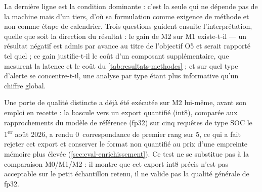La dernière ligne est la condition dominante : c'est la seule qui ne dépende pas de la machine mais
d'un tiers, d'où sa formulation comme exigence de méthode et non comme étape de calendrier. Trois
questions guident ensuite l'interprétation, quelle que soit la direction du résultat : le gain de
M2 sur M1 existe-t-il --- un résultat négatif est admis par avance au titre de l'objectif O5 et
serait rapporté tel quel ; ce gain justifie-t-il le coût d'un composant supplémentaire, que
mesurent la latence et le coût du \cref{tab:resultats-methodes} ; et sur quel type d'alerte se
concentre-t-il, une analyse par type étant plus informative qu'un chiffre global.

Une porte de qualité distincte a déjà été exécutée sur M2 lui-même, avant son emploi en recette :
la bascule vers un export quantifié (int8), comparée aux rapprochements du modèle de référence
(fp32) sur cinq requêtes de type SOC le 1\textsuperscript{er} août 2026, a rendu 0~correspondance
de premier rang sur 5, ce qui a fait rejeter cet export et conserver le format non quantifié au
prix d'une empreinte mémoire plus élevée (\cref{sec:eval-enrichissement}). Ce test ne se substitue
pas à la comparaison M0/M1/M2 : il montre que cet export int8 précis n'est pas acceptable sur le
petit échantillon retenu, il ne valide pas la qualité générale de fp32.

\setlength{\textfloatsep}{20pt plus 2pt minus 4pt}
\setlength{\intextsep}{12pt plus 2pt minus 2pt}
\setlength{\floatsep}{12pt plus 2pt minus 2pt}
